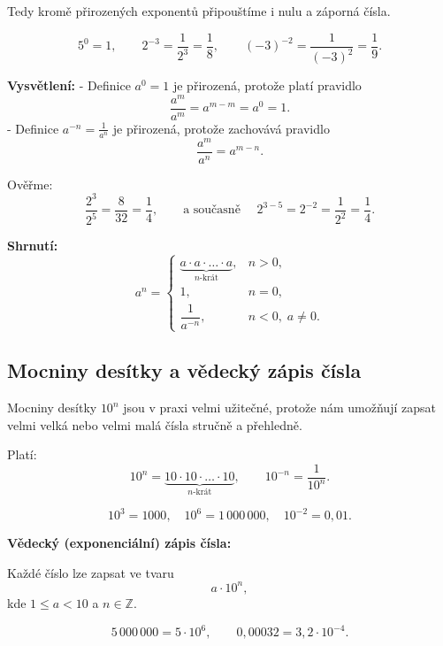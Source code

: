 \documentclass[12pt,a4paper]{article}
\begin{document}
Tedy kromě přirozených exponentů připouštíme i nulu a záporná čísla.

\begin{examplebox}
\[
5^0 = 1, \qquad 
2^{-3} = \frac{1}{2^3} = \frac{1}{8}, \qquad 
(-3)^{-2} = \frac{1}{(-3)^2} = \frac{1}{9}.
\]
\end{examplebox}

\textbf{Vysvětlení:}  
- Definice $a^0 = 1$ je přirozená, protože platí pravidlo
\[
\frac{a^m}{a^m} = a^{m-m} = a^0 = 1.
\]
- Definice $a^{-n} = \tfrac{1}{a^n}$ je přirozená, protože zachovává pravidlo
\[
\frac{a^m}{a^n} = a^{m-n}.
\]

\begin{examplebox}
Ověřme:
\[
\frac{2^3}{2^5} = \frac{8}{32} = \frac{1}{4}, 
\qquad 
\text{a současně } \quad 2^{3-5} = 2^{-2} = \frac{1}{2^2} = \frac{1}{4}.
\]
\end{examplebox}

\textbf{Shrnutí:}  
\[
a^n =
\begin{cases}
\underbrace{a \cdot a \cdot \ldots \cdot a}_{n\text{-krát}}, & n > 0, \\[6pt]
1, & n = 0, \\[6pt]
\dfrac{1}{a^{-n}}, & n < 0, \; a \neq 0.
\end{cases}
\]


\subsection{Mocniny desítky a vědecký zápis čísla}

Mocniny desítky $10^n$ jsou v praxi velmi užitečné, protože nám umožňují zapsat velmi velká nebo velmi malá čísla stručně a přehledně.

\begin{definitionbox}
Platí:
\[
10^n = \underbrace{10 \cdot 10 \cdot \ldots \cdot 10}_{n\text{-krát}}, 
\qquad 
10^{-n} = \frac{1}{10^n}.
\]
\end{definitionbox}

\begin{examplebox}
\[
10^3 = 1000, \quad 10^6 = 1\,000\,000, \quad 10^{-2} = 0{,}01.
\]
\end{examplebox}


\textbf{Vědecký (exponenciální) zápis čísla:}

Každé číslo lze zapsat ve tvaru
\[
a \cdot 10^n,
\]
kde $1 \leq a < 10$ a $n \in \mathbb{Z}$.

\begin{examplebox}
\[
5\,000\,000 = 5 \cdot 10^6, \qquad
0{,}00032 = 3{,}2 \cdot 10^{-4}.
\]
\end{examplebox}
\end{document}
